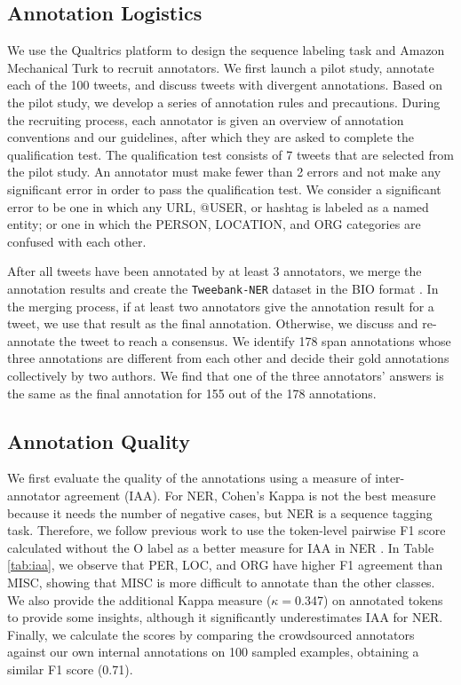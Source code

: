 \documentclass[10pt, a4paper]{article}
\begin{document}
\subsection{Annotation Logistics}
We use the Qualtrics platform to design the sequence labeling task and Amazon Mechanical Turk to recruit annotators. We first launch a pilot study, annotate each of the 100 tweets, and discuss tweets with divergent annotations. Based on the pilot study, we develop a series of annotation rules and precautions. During the recruiting process, each annotator is given an overview of annotation conventions and our guidelines, after which they are asked to complete the qualification test. The qualification test consists of 7 tweets that are selected from the pilot study. 
An annotator must make fewer than 2 errors and not make any significant error in order to pass the qualification test.  We consider a significant error to be one
in which any URL, @USER, or hashtag is labeled as a named entity;  or one in which the PERSON, LOCATION, and ORG categories are confused with each other.


After all tweets have been annotated by at least 3 annotators, we merge the annotation results and create the \texttt{Tweebank-NER} dataset in the BIO format \cite{ratinov2009design}. In the merging process, if at least two annotators give the annotation result for a tweet, we use that result as the final annotation. Otherwise, we discuss and re-annotate the tweet to reach a consensus. We identify 178 span annotations whose three annotations are different from each other and decide their gold annotations collectively by two authors.
We find that one of the three annotators' answers is the same as the final annotation for 155 out of the 178 annotations.






\subsection{Annotation Quality}
We first evaluate the quality of the annotations using a measure of inter-annotator agreement (IAA). For NER, Cohen's Kappa is not the best measure because it needs the number of negative cases, but NER is a sequence tagging task. Therefore, we follow previous work \cite{hripcsak2005agreement,grouin2011proposal,brandsen2020creating} to use the token-level pairwise F1 score calculated without the O label as a better measure for IAA in NER \cite{deleger2012building}. In Table \ref{tab:iaa}, we observe that PER, LOC, and ORG have higher F1 agreement than MISC, showing that MISC is more difficult to annotate than the other classes. We also provide the additional Kappa measure ($\kappa=$0.347) on annotated tokens to provide some insights, although it significantly underestimates IAA for NER. Finally, we calculate the scores by comparing the crowdsourced annotators against our own internal annotations on 100 sampled examples, obtaining a similar F1 score (0.71). 
\end{document}

